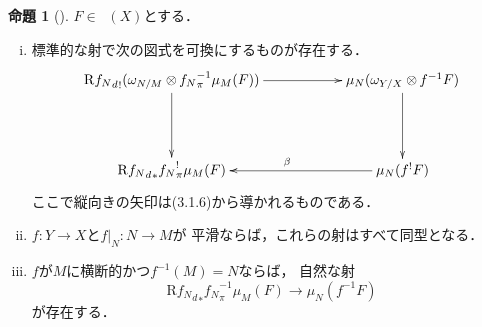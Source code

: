 \documentclass[leqno, 10pt, a4paper, dvipdfmx]{jsarticle}
\theoremstyle{definition}
\numberwithin{equation}{section}
\newcommand{\Dompb}{\mathop{\mathsf{D}^\mathrm{b}}\nolimits}
\newcommand{\Rder}{\mathrm{R}}
\newcommand{\tens}[1][]{\mathbin{\otimes_{\raise1.5ex\hbox to-.1em{}{#1}}}}
\newcommand{\mres}[2][]{{\left.{#1}\right\rvert}_{#2}}
\theoremstyle{mystyle}
\newtheorem{PRP}[AXM]{命題}
\renewenvironment{leftbar}{%
  \def\FrameCommand{\textcolor{lightgray}{\vrule width 4pt} \hspace{10pt}}%
  \MakeFramed {\advance\hsize-\width \FrameRestore}}%
{\endMakeFramed}
\newcommand{\mpb}[1][]{{#1}_{\pi}} %
\newcommand{\mdiff}[1][]{{#1}_{d}} %
\begin{document}
\begin{leftbar}
\begin{PRP}[{\cite[Prop.4.3.5]{KS90}}]\label{prp4.3.5}
  \(F\in\Dompb(X)\)とする．
  \begin{enumerate}[(i)]
      \item 標準的な射で次の図式を可換にするものが存在する．\label{prp4.3.5.1}
      \[\vcenter{\xymatrix@C=56pt@R=46pt{
          \Rder{{\mdiff[f_N]}_{!}}(\omega_{N/M}\tens[]{\mpb[f_N]^{-1}}\mu_{M}(F))
          \ar[d]^{}
          \ar[r]_{}
          &
          \mu_{N}(\omega_{Y/X}\tens[]{f^{-1}}F)
          \ar[d]
          \\
          \Rder{{\mdiff[f_N]}_{\ast}}{\mpb[f_N]^{!}}\mu_{M}(F)
          &
          \mu_{N}({f^{!}}F)
          \ar[l]_{\beta}
      }}\]
      ここで縦向きの矢印は(3.1.6)から導かれるものである．
      \item \label{prp4.3.5.2}
      \(f\colon Y\to X\)と\(\mres[f]{N}\colon N\to M\)が
      平滑ならば，これらの射はすべて同型となる．    
      \item \label{prp4.3.5.3}
      \(f\)が\(M\)に横断的かつ\(f^{-1}(M)=N\)ならば，
      自然な射\[
          \Rder{{\mdiff[f_N]}_{\ast}}\mpb[f_N]^{-1}\mu_{M}(F)
          \to \mu_{N}(f^{-1}F)
      \]が存在する．
  \end{enumerate}
\end{PRP}
\end{leftbar}
\end{document}
